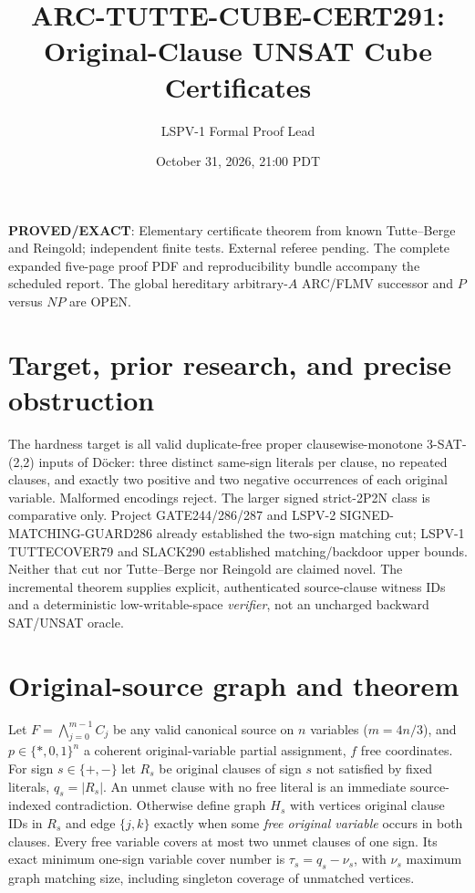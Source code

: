 \documentclass[10pt]{article}
\title{ARC-TUTTE-CUBE-CERT291: Original-Clause UNSAT Cube Certificates}
\author{LSPV-1 Formal Proof Lead}
\date{October 31, 2026, 21:00 PDT}
\begin{document}
\maketitle
\noindent\textbf{PROVED/EXACT}: Elementary certificate theorem from known Tutte--Berge and Reingold; independent finite tests. External referee pending. The complete expanded five-page proof PDF and reproducibility bundle accompany the scheduled report. The global hereditary arbitrary-$A$ ARC/FLMV successor and $P$ versus $NP$ are OPEN.

\section{Target, prior research, and precise obstruction}
The hardness target is all valid duplicate-free proper clausewise-monotone 3-SAT-(2,2) inputs of D\"ocker: three distinct same-sign literals per clause, no repeated clauses, and exactly two positive and two negative occurrences of each original variable. Malformed encodings reject. The larger signed strict-2P2N class is comparative only. Project GATE244/286/287 and LSPV-2 SIGNED-MATCHING-GUARD286 already established the two-sign matching cut; LSPV-1 TUTTECOVER79 and SLACK290 established matching/backdoor upper bounds. Neither that cut nor Tutte--Berge nor Reingold are claimed novel. The incremental theorem supplies explicit, authenticated source-clause witness IDs and a deterministic low-writable-space \emph{verifier}, not an uncharged backward SAT/UNSAT oracle.

\section{Original-source graph and theorem}
Let $F=\bigwedge_{j=0}^{m-1}C_j$ be any valid canonical source on $n$ variables ($m=4n/3$), and $p\in\{\ast,0,1\}^n$ a coherent original-variable partial assignment, $f$ free coordinates. For sign $s\in\{+,-\}$ let $R_s$ be original clauses of sign $s$ not satisfied by fixed literals, $q_s=|R_s|$. An unmet clause with no free literal is an immediate source-indexed contradiction. Otherwise define graph $H_s$ with vertices original clause IDs in $R_s$ and edge $\{j,k\}$ exactly when some \emph{free original variable} occurs in both clauses. Every free variable covers at most two unmet clauses of one sign. Its exact minimum one-sign variable cover number is $\tau_s=q_s-\nu_s$, with $\nu_s$ maximum graph matching size, including singleton coverage of unmatched vertices.
\end{document}
